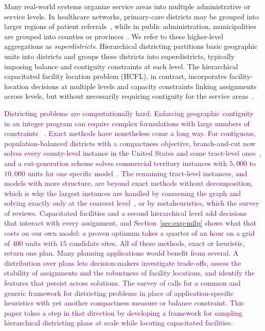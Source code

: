 \documentclass[11pt]{article}
\theoremstyle{definition}
\begin{document}
Many real-world systems organize service areas into multiple administrative or service 
levels. In healthcare networks, primary-care districts may be grouped into larger 
regions of patient referrals~\citep{wang2025cluster}, while in public administration, 
municipalities are grouped into counties or provinces~\citep{bruno2017territorial}. 
We refer to these higher-level aggregations as \emph{superdistricts}. Hierarchical 
districting partitions basic geographic units into districts and groups these districts 
into superdistricts, typically imposing balance and contiguity constraints at each 
level. The hierarchical capacitated facility location problem (HCFL), in contrast, 
incorporates facility-location decisions at multiple levels and capacity constraints 
linking assignments across levels, but without necessarily requiring contiguity for the
service areas~\citep{contreras2020hierarchical}. 

\textcolor{purple}{Districting problems are computationally hard. Enforcing geographic contiguity in an 
integer program can require complex formulations with large numbers of 
constraints~\citep{validi2022imposing}
. Exact methods have nonetheless come a long way. For contiguous, population-balanced 
districts with a compactness objective, branch-and-cut now solves every county-level 
instance in the United States and some tract-level ones~\citep{validi2022cutedges, 
validi2022imposing}, and a cut-generation scheme solves commercial territory instances 
with $5{,}000$ to $10{,}000$ units for one specific model~\citep{rios2013commercial}. 
The remaining tract-level instances, and models with more structure, are beyond exact 
methods without decomposition, which is why the largest instances are handled by coarsening 
the graph and solving exactly only at the coarsest level~\citep{swamy2023multiobjective},
or by metaheuristics, which the survey of \citet{kalcsics2020districting} reviews. 
Capacitated facilities and a second hierarchical level add decisions that interact with 
every assignment, and Section~\ref{sec:exp-milp} shows what that costs on our own model: 
a proven optimum takes a quarter of an hour on a grid of $400$ units with $15$ candidate 
sites. All of these methods, exact or heuristic, return one plan. Many planning 
applications would benefit from several. A distribution over plans lets decision-makers 
investigate trade-offs, assess the stability of assignments and the robustness of facility 
locations, and identify the features that persist across solutions. The survey of 
\citet{kalcsics2020districting} calls for a common and generic framework for districting 
problems in place of application-specific heuristics with yet another compactness measure 
or balance constraint. This paper takes a step in that direction by developing a framework 
for sampling hierarchical districting plans at scale while locating capacitated facilities.}
\end{document}
